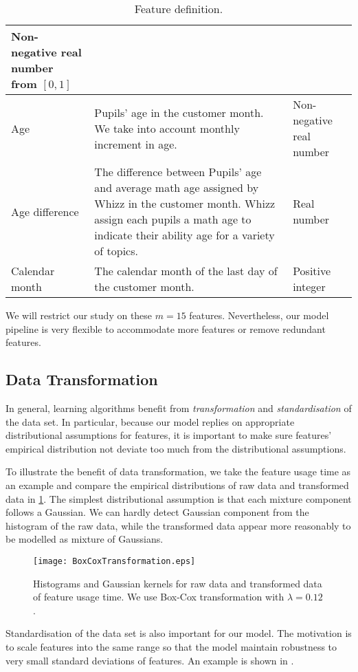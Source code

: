 \begin{table}[!h]
\begin{tabular}{p{3cm}|p{7cm}|p{3.3cm}}
Non-negative real number from $[0,1]$ \\
\hline
Age &
Pupils' age in the customer month. We take into account monthly increment in age.&
Non-negative real number \\
\hline
Age difference &
The difference between Pupils' age and average math age assigned by Whizz in the customer month. Whizz assign each pupils a math age to indicate their ability age for a variety of topics.&
Real number \\
\hline
Calendar month &
The calendar month of the last day of the customer month. &
Positive integer \\
\hline
\end{tabular}
\caption{Feature definition.}
\label{tab:featureDefinition}
\end{table}

We will restrict our study on these $m=15$ features. Nevertheless, our model pipeline is very flexible to accommodate more features or remove redundant features.

\subsection{Data Transformation}

In general, learning algorithms benefit from \textit{transformation} and \textit{standardisation} of the data set. In particular, because our model replies on appropriate distributional assumptions for features, it is important to make sure features' empirical distribution not deviate too much from the distributional assumptions.

To illustrate the benefit of data transformation, we take the feature usage time as an example and compare the empirical distributions of raw data and transformed data in \ref{fig:boxcox}. The simplest distributional assumption is that each mixture component follows a Gaussian. We can hardly detect Gaussian component from the histogram of the raw data, while the transformed data appear more reasonably to be modelled as mixture of Gaussians. 

\begin{figure}[!h]
\centering
\texttt{[image: BoxCoxTransformation.eps]}
\caption{Histograms and Gaussian kernels for raw data and transformed data of feature usage time. We use Box-Cox transformation with $\lambda=0.12$.}
\label{fig:boxcox}
\end{figure}

Standardisation of the data set is also important for our model. The motivation is to scale features into the same range so that the model maintain robustness to very small standard deviations of features. An example is shown in .

